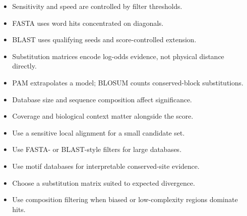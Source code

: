 \documentclass[11pt]{article}
\begin{document}
\begin{tcolorbox}[enhanced,breakable,title={Key takeaways},
  colback=white,colframe=Primary,fonttitle=\small\sffamily\bfseries,fontupper=\footnotesize,
  boxsep=0.6mm,left=1.5mm,right=1.5mm,top=1mm,bottom=1mm,before skip=3pt,after skip=3pt]
\begin{itemize}
  \item Sensitivity and speed are controlled by filter thresholds.
  \item FASTA uses word hits concentrated on diagonals.
  \item BLAST uses qualifying seeds and score-controlled extension.
  \item Substitution matrices encode log-odds evidence, not physical distance directly.
  \item PAM extrapolates a model; BLOSUM counts conserved-block substitutions.
  \item Database size and sequence composition affect significance.
  \item Coverage and biological context matter alongside the score.
\end{itemize}
\end{tcolorbox}

\begin{tcolorbox}[enhanced,breakable,title={Algorithm selection / when to use this},
  colback=Primary!3,colframe=Primary,fonttitle=\small\sffamily\bfseries,fontupper=\footnotesize,
  boxsep=0.6mm,left=1.5mm,right=1.5mm,top=1mm,bottom=1mm,before skip=3pt,after skip=3pt]
\begin{itemize}
  \item Use a sensitive local alignment for a small candidate set.
  \item Use FASTA- or BLAST-style filters for large databases.
  \item Use motif databases for interpretable conserved-site evidence.
  \item Choose a substitution matrix suited to expected divergence.
  \item Use composition filtering when biased or low-complexity regions dominate hits.
\end{itemize}
\end{tcolorbox}
\end{document}
